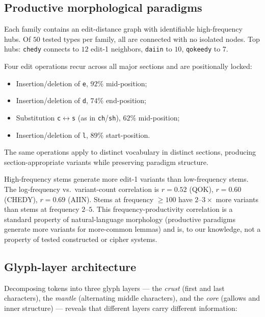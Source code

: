 \documentclass[11pt]{article}
\begin{document}
\subsection{Productive morphological paradigms}

Each family contains an edit-distance graph with identifiable high-frequency
hubs. Of $50$ tested types per family, all are connected with no isolated
nodes. Top hubs: \texttt{chedy} connects to $12$ edit-1 neighbors,
\texttt{daiin} to $10$, \texttt{qokeedy} to $7$.

Four edit operations recur across all major sections and are positionally
locked:
\begin{itemize}
  \item Insertion/deletion of \texttt{e}, $92\%$ mid-position;
  \item Insertion/deletion of \texttt{d}, $74\%$ end-position;
  \item Substitution \texttt{c}$\leftrightarrow$\texttt{s} (as in
        \texttt{ch}/\texttt{sh}), $62\%$ mid-position;
  \item Insertion/deletion of \texttt{l}, $89\%$ start-position.
\end{itemize}

The same operations apply to distinct vocabulary in distinct sections,
producing section-appropriate variants while preserving paradigm structure.

High-frequency stems generate more edit-1 variants than low-frequency stems.
The log-frequency vs.~variant-count correlation is $r = 0.52$ (QOK),
$r = 0.60$ (CHEDY), $r = 0.69$ (AIIN). Stems at frequency $\geq 100$ have
$2$--$3\times$ more variants than stems at frequency $2$--$5$. This
frequency-productivity correlation is a standard property of natural-language
morphology (productive paradigms generate more variants for more-common
lemmas) and is, to our knowledge, not a property of tested constructed or
cipher systems.

\subsection{Glyph-layer architecture}

Decomposing tokens into three glyph layers --- the \emph{crust} (first and
last characters), the \emph{mantle} (alternating middle characters), and the
\emph{core} (gallows and inner structure) --- reveals that different layers
carry different information:
\end{document}
